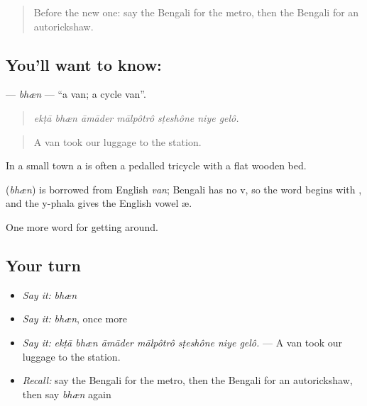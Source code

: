 \label{lesson:BN-C388-bhen}



\begin{quote}
Before the new one: say the Bengali for the metro, then the Bengali for an autorickshaw.
\end{quote}

\subsection*{You'll want to know: }
\textbf{} — \emph{bhæn} — \textquotedblleft{}a van; a cycle van\textquotedblright{}.

\begin{quote}
      
\end{quote}

\begin{quote}
\emph{ekṭā bhæn āmāder mālpôtrô sṭeshône niye gelô.}
\end{quote}

\begin{quote}
A van took our luggage to the station.
\end{quote}

In a small town a  is often a pedalled tricycle with a flat wooden bed.

\begin{cousinweb}
\textbf{} (\emph{bhæn}) is borrowed from English \emph{van}; Bengali has no v, so the word begins with , and the y-phala gives the English vowel æ.
\end{cousinweb}

\begin{grammarlens}[title={What you've built}]
One more word for getting around.
\end{grammarlens}

\subsection*{Your turn}
\begin{itemize}
\raggedright
  \item \emph{Say it:} \emph{bhæn}
  \item \emph{Say it:} \emph{bhæn}, once more
  \item \emph{Say it:} \emph{ekṭā bhæn āmāder mālpôtrô sṭeshône niye gelô.} — A van took our luggage to the station.
  \item \emph{Recall:} say the Bengali for the metro, then the Bengali for an autorickshaw, then say \emph{bhæn} again
\end{itemize}


